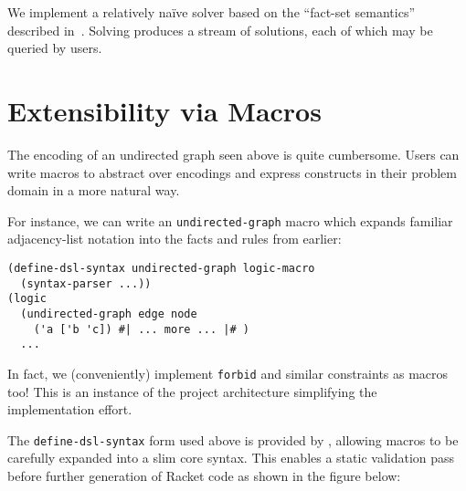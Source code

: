 \documentclass[dvipsnames,sigplan,screen,review,anonymous,acmthm,nonacm]{acmart}
\begin{document}
We implement a relatively naïve solver based on the ``fact-set semantics''
described in~\cite{martens2025dusa}. Solving produces a stream of solutions,
each of which may be queried by users.

\section{Extensibility via Macros}

The encoding of an undirected graph seen above is quite cumbersome. Users can
write macros to abstract over encodings and express constructs in their
problem domain in a more natural way.

For instance, we can write an \texttt{undirected-graph} macro
which expands familiar adjacency-list notation into the facts
and rules from earlier:

\begin{verbatim}
(define-dsl-syntax undirected-graph logic-macro
  (syntax-parser ...))
(logic
  (undirected-graph edge node
    ('a ['b 'c]) #| ... more ... |# )
  ...
\end{verbatim}

In fact, we (conveniently) implement \texttt{forbid} and similar constraints
as macros too!
This is an instance of the project architecture simplifying the implementation effort.

The \texttt{define-dsl-syntax} form used above is provided by \syntaxspec{},
allowing \miniDusa{} macros to be carefully expanded into a slim core syntax.
This enables a static validation pass before further generation of Racket code
as shown in the figure below:
\end{document}

